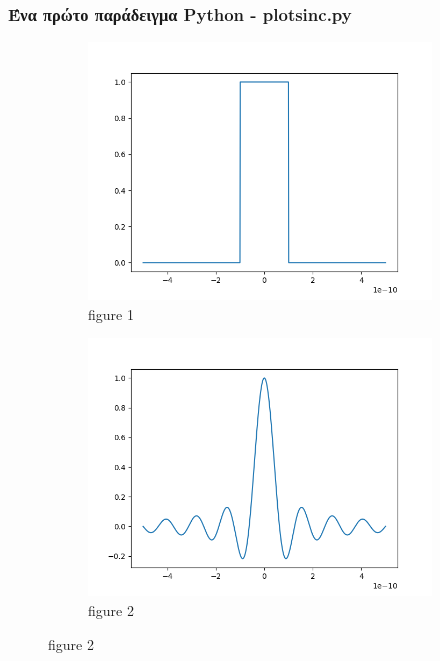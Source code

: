 \documentclass[9pt]{beamer}
\begin{document}
	\begin{frame}
		\frametitle{Ένα πρώτο παράδειγμα Python - plotsinc.py}
		\begin{figure}
			\begin{subfigure}{0.49\linewidth}
				\includegraphics[width=\linewidth]{pulse}
				\caption{figure 1}
			\end{subfigure}	
			\begin{subfigure}{0.49\linewidth}
				\includegraphics[width=\linewidth]{sinc}
				\caption{figure 2}	
		\end{subfigure}	
		\end{figure}
	\end{frame}
	
\end{document}
